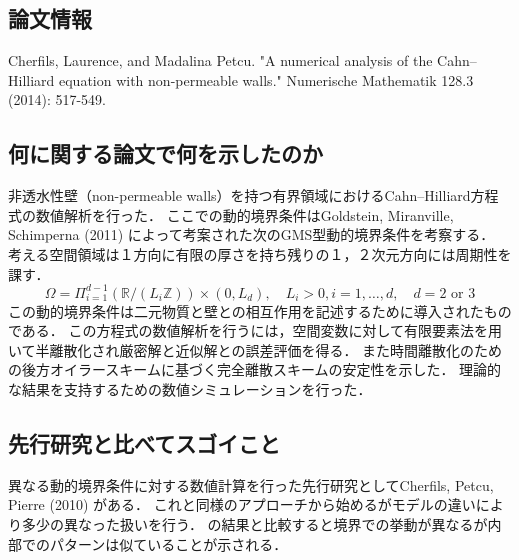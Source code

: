 \documentclass[openary, a4paper, oneside]{jsarticle}
\begin{document}
  \subsection{論文情報}
  Cherfils, Laurence, and Madalina Petcu. "A numerical analysis of the Cahn–Hilliard equation with non-permeable walls." Numerische Mathematik 128.3 (2014): 517-549.
  \subsection{何に関する論文で何を示したのか}
  非透水性壁（non-permeable walls）を持つ有界領域におけるCahn--Hilliard方程式の数値解析を行った．
  ここでの動的境界条件はGoldstein, Miranville, Schimperna (2011) \cite{GoldsteinMiranvilleSchimperna2011} によって考案された次のGMS型動的境界条件を考察する．
  考える空間領域は１方向に有限の厚さを持ち残りの１，２次元方向には周期性を課す．
  \begin{equation}
    \Omega=\Pi_{i=1}^{d-1}\left(\mathbb{R} /\left(L_{i} \mathbb{Z}\right)\right) \times\left(0, L_{d}\right), \quad L_{i}>0, i=1, \ldots, d, \quad d=2 \text { or } 3
  \end{equation}
  この動的境界条件は二元物質と壁との相互作用を記述するために導入されたものである．
  この方程式の数値解析を行うには，空間変数に対して有限要素法を用いて半離散化され厳密解と近似解との誤差評価を得る．
  また時間離散化のための後方オイラースキームに基づく完全離散スキームの安定性を示した．
  理論的な結果を支持するための数値シミュレーションを行った．
  \subsection{先行研究と比べてスゴイこと}
  異なる動的境界条件に対する数値計算を行った先行研究としてCherfils, Petcu, Pierre (2010) \cite{CherfilsPetcuPierre2010}がある．
  これと同様のアプローチから始めるがモデルの違いにより多少の異なった扱いを行う．
  \cite{CherfilsPetcuPierre2010}の結果と比較すると境界での挙動が異なるが内部でのパターンは似ていることが示される．
\end{document}
